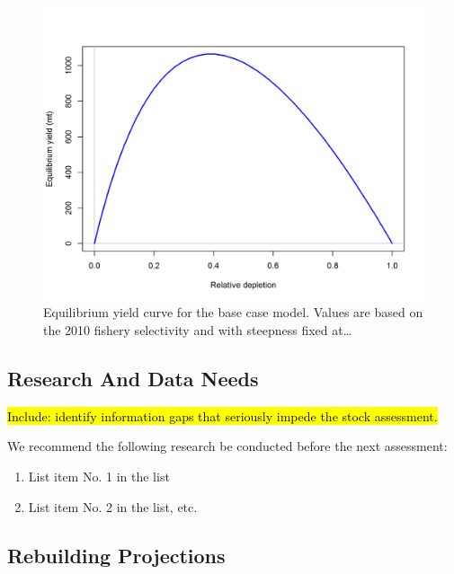 \documentclass[12pt,]{article}
\begin{document}
\begin{figure}
\centering
\includegraphics{r4ss/plots_mod1/yield1_yield_curve.png}
\caption{Equilibrium yield curve for the base case model. Values are
based on the 2010 fishery selectivity and with steepness fixed
at\ldots{} \label{fig:Yield_all}}
\end{figure}

\FloatBarrier

\newpage

\subsection*{Research And Data Needs}\label{research-and-data-needs}

\hl{Include: identify information gaps that seriously impede the stock assessment.}

We recommend the following research be conducted before the next
assessment:

\begin{enumerate}

\item List item No. 1 in the list

\item List item No. 2 in the list, etc.

\end{enumerate}

\subsection*{Rebuilding Projections}\label{rebuilding-projections}
\end{document}
